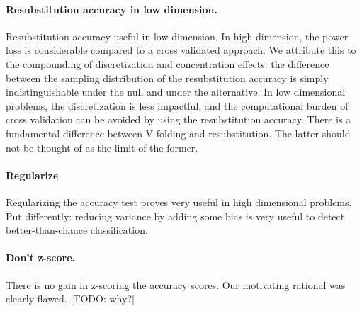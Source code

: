 \documentclass[12pt,a4paper]{article}
\theoremstyle{definition}
\begin{document}
\paragraph{Resubstitution accuracy in low dimension.} Resubstitution accuracy useful in low dimension.
In high dimension, the power loss is considerable compared to a cross validated approach. 
We attribute this to the compounding of discretization and concentration effects: the difference between the sampling distribution of the resubstitution accuracy is simply indistinguishable under the null and under the alternative. 
In low dimensional problems, the discretization is less impactful, and the computational burden of cross validation can be avoided by using the resubstitution accuracy. 
There is a fundamental difference between V-folding and resubstitution. The latter should not be thought of as the limit of the former. 

\paragraph{Regularize}
Regularizing the accuracy test proves very useful in high dimensional problems. 
Put differently: reducing variance by adding some bias is very useful to detect better-than-chance classification. 

\paragraph{Don't z-score.} There is no gain in z-scoring the accuracy scores. Our motivating rational was clearly flawed. [TODO: why?]
\end{document}
